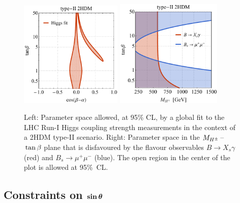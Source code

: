 \documentclass[a4paper, 11pt,notoc]{article}
\def\bm#1{\mbox{\boldmath$#1$\unboldmath}}
\begin{document}
\begin{figure}[t!]
\centering
\includegraphics[width=0.435\textwidth]{figure3l.pdf} \qquad 
\includegraphics[width=0.45\textwidth]{figure3r.pdf}
\vspace{4mm}
\caption{\label{fig:higgsflavourfit} Left: Parameter space allowed, at 95\% CL, by a global fit to the LHC Run-I Higgs coupling strength measurements in the context of a 2HDM type-II scenario. Right: Parameter space in the $M_{H^\pm}\hspace{0.5mm}$--$\hspace{0.5mm}\tan \beta$ plane that is disfavoured by the flavour observables $B \to X_s \gamma$ (red) and $B_s \to \mu^+ \mu^-$ (blue). The open region in the center of the plot is allowed at 95\%~CL. }
\end{figure}

\subsection[Constraints on $\sin \theta$]{Constraints on $\bm{\sin \theta}$}
\label{sec:EWPO}
\end{document}
